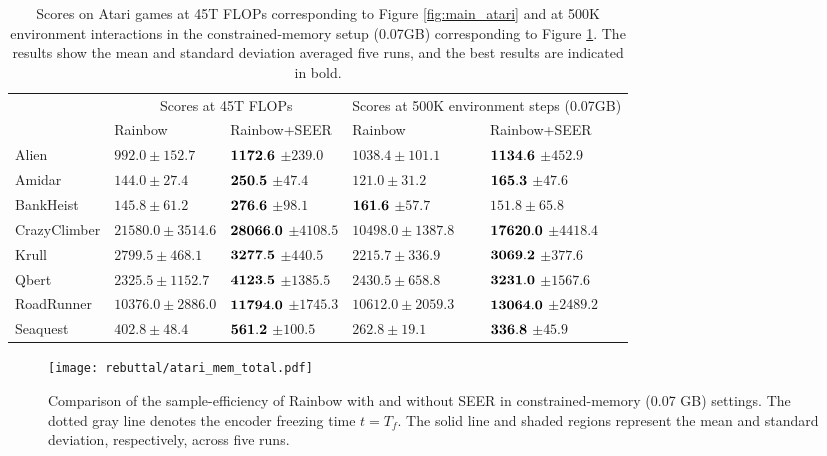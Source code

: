 \documentclass{article}
\begin{document}
\begin{table*}[]
\centering
\small
\begin{tabular}{l|ll|ll}
\toprule
 & \multicolumn{2}{c|}{Scores at 45T FLOPs} & \multicolumn{2}{c}{Scores  at 500K environment steps (0.07GB)} \\ \cline{2-5} 
 & Rainbow         & Rainbow+SEER         
 & Rainbow                 & Rainbow+SEER                  \\
 \midrule
Alien & $992.0 \pm 152.7$ & $\bf{1172.6}$ $\pm 239.0$ & $1038.4 \pm 101.1$ & $\bf{1134.6}$ $\pm 452.9$ \\
Amidar & $144.0 \pm 27.4$ & $\bf{250.5}$ $\pm 47.4$ &           $121.0 \pm 31.2$ & $\bf{165.3}$ $\pm 47.6$ \\
BankHeist & $145.8 \pm 61.2$ & $\bf{276.6}$ $\pm 98.1$ &            $\bf{161.6}$ $\pm 57.7$ & $151.8 \pm 65.8$ \\
CrazyClimber & $21580.0 \pm 3514.6$ & $\bf{28066.0}$ $\pm 4108.5$  & $10498.0 \pm 1387.8$ & $\bf{17620.0}$ $\pm 4418.4$  \\
Krull & $2799.5 \pm 468.1$ & $\bf{3277.5}$ $\pm 440.5$  &            $2215.7 \pm 336.9$ & $\bf{3069.2}$ $\pm 377.6$ \\
Qbert & $2325.5 \pm 1152.7$ & $\bf{4123.5}$ $\pm 1385.5$ &            $2430.5 \pm 658.8$ & $\bf{3231.0}$ $\pm 1567.6$ \\
RoadRunner & $10376.0 \pm 2886.0$ & $\bf{11794.0}$ $\pm 1745.3$ &       $10612.0 \pm 2059.3$ & $\bf{13064.0}$ $\pm 2489.2$ \\
Seaquest & $402.8 \pm 48.4$ & $\bf{561.2}$ $\pm 100.5$ &             $262.8 \pm 19.1$ & $\bf{336.8}$ $\pm 45.9$ \\
 \bottomrule
\end{tabular}
\caption{Scores on Atari games at 45T FLOPs corresponding to Figure \ref{fig:main_atari} and at 500K environment interactions in the constrained-memory setup (0.07GB) corresponding to Figure \ref{fig:memory_atari}. The results show the mean and standard deviation averaged five runs, and the best results are indicated in bold.} \label{tbl:main_atari}
\vspace{-0.1in}
\end{table*}

\begin{figure*} [ht] \centering
\texttt{[image: rebuttal/atari\_mem\_total.pdf]}
\caption{Comparison of the sample-efficiency of Rainbow with and without SEER in constrained-memory (0.07 GB) settings. The dotted gray line denotes the encoder freezing time $t=T_f$. The solid line and shaded regions represent the mean and standard deviation, respectively, across five runs.} \label{fig:memory_atari}
\vspace{-0.1in}
\end{figure*}
\end{document}
